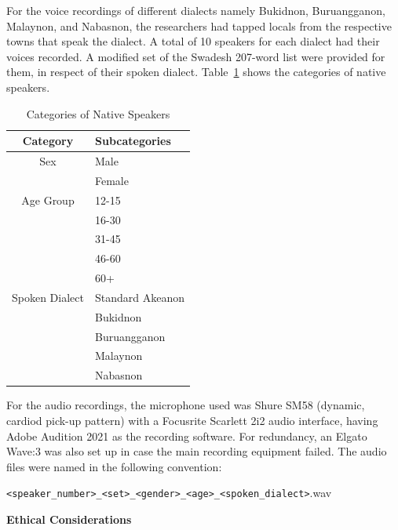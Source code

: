 For the voice recordings of different dialects namely Bukidnon, Buruangganon, Malaynon, and Nabasnon, the researchers had tapped locals from the respective towns that speak the dialect. A total of 10 speakers for each dialect had their voices recorded. A modified set of the Swadesh 207-word list were provided for them, in respect of their spoken dialect. Table~\ref{tab:native_speakers} shows the categories of native speakers. 

\begin{table}[H]
   \centering
   \caption{Categories of Native Speakers} \vspace{0.25em}
   \label{tab:native_speakers}
   \renewcommand{\arraystretch}{1.5} %
   \setlength{\tabcolsep}{10pt} %

\begin{tabular}{|c|p{2in}|} \hline
   \centering Category & Subcategories \\ \hline
   Sex & Male \\ 
   & Female \\ 
   \hline
   Age Group & 
   12-15 \\ 
   & 16-30 \\ 
   & 31-45 \\ 
   & 46-60 \\
   & 60+ \\ \hline
   Spoken Dialect & 
   Standard Akeanon \\ 
   & Bukidnon \\ 
   & Buruangganon \\ 
   & Malaynon \\ 
   & Nabasnon \\ \hline
\end{tabular}
\end{table}

For the audio recordings, the microphone used was Shure SM58 (dynamic, cardiod pick-up pattern) with a Focusrite Scarlett 2i2 audio interface, having Adobe Audition 2021 as the recording software. For redundancy, an Elgato Wave:3 was also set up in case the main recording equipment failed. The audio files were named in the following convention: 

\texttt{\textless speaker\_number\textgreater\_\textless set\textgreater\_\textless gender\textgreater\_\textless age\textgreater\_\textless spoken\_dialect\textgreater}.wav

\textbf{Ethical Considerations}


